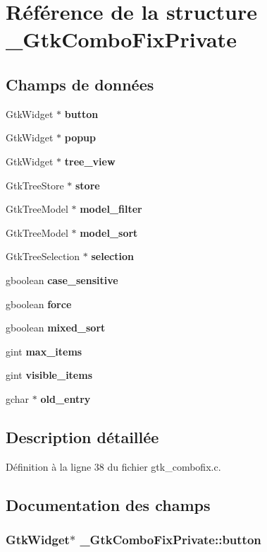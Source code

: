 \section{Référence de la structure \_\-GtkComboFixPrivate}
\label{struct__GtkComboFixPrivate}
\subsection*{Champs de données}
\begin{DoxyCompactItemize}
\item 
GtkWidget $\ast$ {\bf button}
\item 
GtkWidget $\ast$ {\bf popup}
\item 
GtkWidget $\ast$ {\bf tree\_\-view}
\item 
GtkTreeStore $\ast$ {\bf store}
\item 
GtkTreeModel $\ast$ {\bf model\_\-filter}
\item 
GtkTreeModel $\ast$ {\bf model\_\-sort}
\item 
GtkTreeSelection $\ast$ {\bf selection}
\item 
gboolean {\bf case\_\-sensitive}
\item 
gboolean {\bf force}
\item 
gboolean {\bf mixed\_\-sort}
\item 
gint {\bf max\_\-items}
\item 
gint {\bf visible\_\-items}
\item 
gchar $\ast$ {\bf old\_\-entry}
\end{DoxyCompactItemize}


\subsection{Description détaillée}


Définition à la ligne 38 du fichier gtk\_\-combofix.c.



\subsection{Documentation des champs}
\subsubsection[{button}]{\setlength{\rightskip}{0pt plus 5cm}GtkWidget$\ast$ {\bf \_\-GtkComboFixPrivate::button}}\label{struct__GtkComboFixPrivate_a0a72791e278d1387566e63f0fced7129}


